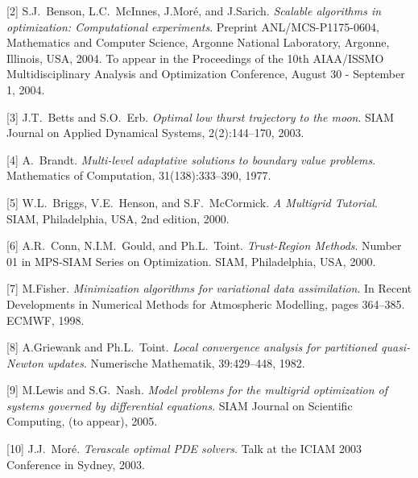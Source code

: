 \documentclass{report}
\begin{document}
[2] S.J.~Benson, L.C.~McInnes, J.Mor\'{e}, and J.Sarich. {\em Scalable
algorithms in optimization: Computational experiments}. Preprint
ANL/MCS-P1175-0604, Mathematics and Computer Science, Argonne National
Laboratory, Argonne, Illinois, USA, 2004. To appear in the Proceedings
of the 10th AIAA/ISSMO Multidisciplinary Analysis and Optimization
Conference, August 30 - September 1, 2004.

[3] J.T.~Betts and S.O.~Erb. {\em Optimal low thurst trajectory to the moon}.
SIAM Journal on Applied Dynamical Systems, 2(2):144--170, 2003.

[4] A.~Brandt. {\em Multi-level adaptative solutions to boundary value
problems}. Mathematics of Computation, 31(138):333--390, 1977.

[5] W.L.~Briggs, V.E.~Henson, and S.F.~McCormick. {\em A Multigrid Tutorial}.
SIAM, Philadelphia, USA, 2nd edition, 2000.

[6] A.R.~Conn, N.I.M.~Gould, and Ph.L.~Toint. {\em Trust-Region Methods}.
Number 01 in MPS-SIAM Series on Optimization. SIAM, Philadelphia, USA,
2000.

[7] M.Fisher. {\em Minimization algorithms for variational data
assimilation}. In Recent Developments in Numerical Methods for
Atmospheric Modelling, pages 364--385. ECMWF, 1998.

[8] A.Griewank and Ph.L.~Toint. {\em Local convergence analysis for
partitioned quasi-Newton updates}. Numerische Mathematik, 39:429--448,
1982.

[9] M.Lewis and S.G.~Nash. {\em Model problems for the multigrid
optimization of systems governed by differential equations}.
SIAM Journal on Scientific Computing, (to appear), 2005.

[10] J.J.~Mor\'{e}. {\em Terascale optimal PDE solvers}.
Talk at the ICIAM 2003 Conference in Sydney, 2003. 
\end{document}
